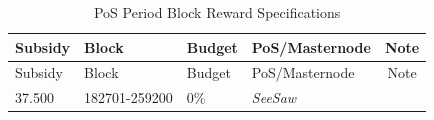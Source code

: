 \documentclass[11pt,a4paperpaper,]{report}
\begin{document}
\begin{longtable}[]{@{}llllc@{}}
\caption{PoS Period Block Reward Specifications
\label{ref_c_table}}\tabularnewline
\toprule
\begin{minipage}[b]{0.12\columnwidth}\raggedright\strut
Subsidy\strut
\end{minipage} & \begin{minipage}[b]{0.19\columnwidth}\raggedright\strut
Block\strut
\end{minipage} & \begin{minipage}[b]{0.14\columnwidth}\raggedright\strut
Budget\strut
\end{minipage} & \begin{minipage}[b]{0.25\columnwidth}\raggedright\strut
PoS/Masternode\strut
\end{minipage} & \begin{minipage}[b]{0.12\columnwidth}\centering\strut
Note\strut
\end{minipage}\tabularnewline
\midrule
\endfirsthead
\toprule
\begin{minipage}[b]{0.12\columnwidth}\raggedright\strut
Subsidy\strut
\end{minipage} & \begin{minipage}[b]{0.19\columnwidth}\raggedright\strut
Block\strut
\end{minipage} & \begin{minipage}[b]{0.14\columnwidth}\raggedright\strut
Budget\strut
\end{minipage} & \begin{minipage}[b]{0.25\columnwidth}\raggedright\strut
PoS/Masternode\strut
\end{minipage} & \begin{minipage}[b]{0.12\columnwidth}\centering\strut
Note\strut
\end{minipage}\tabularnewline
\midrule
\endhead
\begin{minipage}[t]{0.12\columnwidth}\raggedright\strut
37.500\strut
\end{minipage} & \begin{minipage}[t]{0.19\columnwidth}\raggedright\strut
182701-259200\strut
\end{minipage} & \begin{minipage}[t]{0.14\columnwidth}\raggedright\strut
0\%\strut
\end{minipage} & \begin{minipage}[t]{0.25\columnwidth}\raggedright\strut
\textit{SeeSaw}\strut
\end{minipage} & \begin{minipage}[t]{0.12\columnwidth}\centering\strut

\end{minipage}
\end{longtable}
\end{document}
